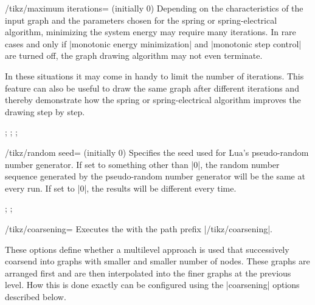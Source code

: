 \begin{key}{/tikz/maximum iterations= (initially 0)}
  Depending on the characteristics of the input graph and the parameters
  chosen for the spring or spring-electrical algorithm, minimizing the
  system energy may require many iterations. In rare cases and only if
  |monotonic energy minimization| and |monotonic step control| are
  turned off, the graph drawing algorithm may not even terminate.

  In these situations it may come in handy to limit the number of
  iterations. This feature can also be useful to draw the same graph
  after different iterations and thereby demonstrate how the spring or
  spring-electrical algorithm improves the drawing step by step.
  \begin{codeexample}[]
\tikz {};
\tikz {};
\tikz {};
  \end{codeexample}
\end{key}

\begin{key}{/tikz/random seed= (initially 0)}
  Specifies the seed used for Lua's pseudo-random number generator. If
  set to something other than |0|, the random number sequence generated
  by the pseudo-random number generator will be the same at every run.
  If set to |0|, the results will be different every time.
  \begin{codeexample}[]
\tikz {};
\tikz {};
  \end{codeexample}
\end{key}

\begin{key}{/tikz/coarsening=}
  Executes the  with the path prefix |/tikz/coarsening|.
  
  These options define whether a multilevel approach is used that
  successively coarsend into graphs with smaller and smaller number
  of nodes. These graphs are arranged first and are then interpolated
  into the finer graphs at the previous level. How this is done exactly
  can be configured using the |coarsening| options described below.
\end{key}

